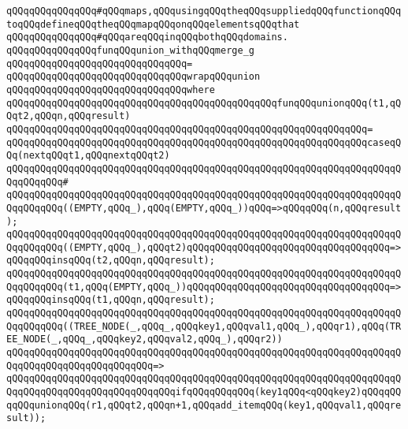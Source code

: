 \verb|qQQqqQQqqQQqqQQq#qQQqmaps,qQQqusingqQQqtheqQQqsuppliedqQQqfunctionqQQqtoqQQqdefineqQQqtheqQQqmapqQQqonqQQqelementsqQQqthat|\newline
\verb|qQQqqQQqqQQqqQQq#qQQqareqQQqinqQQqbothqQQqdomains.|\newline
\newline
\verb|qQQqqQQqqQQqqQQqfunqQQqunion_withqQQqmerge_g|\newline
\verb|qQQqqQQqqQQqqQQqqQQqqQQqqQQqqQQq=|\newline
\verb|qQQqqQQqqQQqqQQqqQQqqQQqqQQqqQQqwrapqQQqunion|\newline
\verb|qQQqqQQqqQQqqQQqqQQqqQQqqQQqqQQqwhere|\newline
\verb|qQQqqQQqqQQqqQQqqQQqqQQqqQQqqQQqqQQqqQQqqQQqqQQqfunqQQqunionqQQq(t1,qQQqt2,qQQqn,qQQqresult)|\newline
\verb|qQQqqQQqqQQqqQQqqQQqqQQqqQQqqQQqqQQqqQQqqQQqqQQqqQQqqQQqqQQqqQQq=|\newline
\verb|qQQqqQQqqQQqqQQqqQQqqQQqqQQqqQQqqQQqqQQqqQQqqQQqqQQqqQQqqQQqqQQqcaseqQQq(nextqQQqt1,qQQqnextqQQqt2)|\newline
\verb|qQQqqQQqqQQqqQQqqQQqqQQqqQQqqQQqqQQqqQQqqQQqqQQqqQQqqQQqqQQqqQQqqQQqqQQqqQQqqQQq#|\newline
\verb|qQQqqQQqqQQqqQQqqQQqqQQqqQQqqQQqqQQqqQQqqQQqqQQqqQQqqQQqqQQqqQQqqQQqqQQqqQQqqQQq((EMPTY,qQQq_),qQQq(EMPTY,qQQq_))qQQq=>qQQqqQQq(n,qQQqresult);|\newline
\verb|qQQqqQQqqQQqqQQqqQQqqQQqqQQqqQQqqQQqqQQqqQQqqQQqqQQqqQQqqQQqqQQqqQQqqQQqqQQqqQQq((EMPTY,qQQq_),qQQqt2)qQQqqQQqqQQqqQQqqQQqqQQqqQQqqQQqqQQq=>qQQqqQQqinsqQQq(t2,qQQqn,qQQqresult);|\newline
\verb|qQQqqQQqqQQqqQQqqQQqqQQqqQQqqQQqqQQqqQQqqQQqqQQqqQQqqQQqqQQqqQQqqQQqqQQqqQQqqQQq(t1,qQQq(EMPTY,qQQq_))qQQqqQQqqQQqqQQqqQQqqQQqqQQqqQQqqQQq=>qQQqqQQqinsqQQq(t1,qQQqn,qQQqresult);|\newline
\newline
\verb|qQQqqQQqqQQqqQQqqQQqqQQqqQQqqQQqqQQqqQQqqQQqqQQqqQQqqQQqqQQqqQQqqQQqqQQqqQQqqQQq((TREE_NODE(_,qQQq_,qQQqkey1,qQQqval1,qQQq_),qQQqr1),qQQq(TREE_NODE(_,qQQq_,qQQqkey2,qQQqval2,qQQq_),qQQqr2))|\newline
\verb|qQQqqQQqqQQqqQQqqQQqqQQqqQQqqQQqqQQqqQQqqQQqqQQqqQQqqQQqqQQqqQQqqQQqqQQqqQQqqQQqqQQqqQQqqQQqqQQq=>|\newline
\verb|qQQqqQQqqQQqqQQqqQQqqQQqqQQqqQQqqQQqqQQqqQQqqQQqqQQqqQQqqQQqqQQqqQQqqQQqqQQqqQQqqQQqqQQqqQQqqQQqqQQqifqQQqqQQqqQQq(key1qQQq<qQQqkey2)qQQqqQQqqQQqunionqQQq(r1,qQQqt2,qQQqn+1,qQQqadd_itemqQQq(key1,qQQqval1,qQQqresult));|\newline
